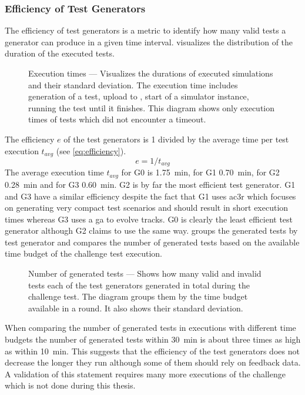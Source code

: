 \subsubsection{Efficiency of Test Generators}
The efficiency of test generators is a metric to identify how many valid tests a generator can produce in a given time interval.
 visualizes the distribution of the duration of the executed tests.
\begin{figure}
    
    \medskip
    \caption{%
        Execution times --- Visualizes the durations of executed simulations and their standard deviation.
        The execution time includes generation of a test, upload to \drivebuild{}, start of a simulator instance, running the test until it finishes.
        This diagram shows only execution times of tests which did not encounter a timeout.
    }\label{fig:exectionTimes}
\end{figure}
The efficiency \(e\) of the test generators is \num{1} divided by the average time per test execution \(t_{avg}\) (see \cref{eq:efficiency}).
\begin{equation}
    \label{eq:efficiency}
    e = 1 / t_{avg}
\end{equation}
The average execution time \(t_{avg}\) for G0 is \SI{1.75}{\minute}, for G1 \SI{0.70}{\minute}, for G2 \SI{0.28}{\minute} and for G3 \SI{0.60}{\minute}.
G2 is by far the most efficient test generator.
G1 and G3 have a similar efficiency despite the fact that G1 uses \gls{ac3r} which focuses on generating very compact test scenarios and should result in short execution times whereas G3 uses a \gls{ga} to evolve tracks.
G0 is clearly the least efficient test generator although G2 claims to use \asfault{} the same way.
 groups the generated tests by test generator and compares the number of generated tests based on the available time budget of the challenge test execution.
\begin{figure}
    
    \medskip
    \caption{%
        Number of generated tests --- Shows how many valid and invalid tests each of the test generators generated in total during the challenge test.
        The diagram groups them by the time budget available in a round.
        It also shows their standard deviation.
    }\label{fig:numberOfTests}
\end{figure}
When comparing the number of generated tests in executions with different time budgets the number of generated tests within \SI{30}{\minute} is about three times as high as within \SI{10}{\minute}.
This suggests that the efficiency of the test generators does not decrease the longer they run although some of them should rely on feedback data.
A validation of this statement requires many more executions of the challenge which is not done during this thesis.
